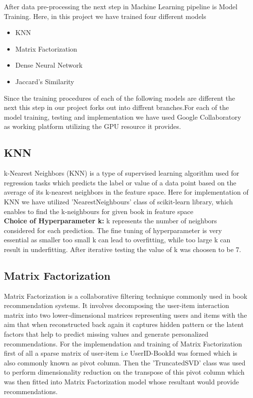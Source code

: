 After data pre-processing the next step in Machine Learning pipeline is Model Training. Here, in this project we have trained four different models 
\begin{itemize}
    \item KNN
    \item Matrix Factorization
    \item Dense Neural Network
    \item Jaccard's Similarity
\end{itemize}

Since the training procedures of each of the following models are different the next this step in our project forks out into diffrent branches.For each of the model training, testing and implementation we have used Google Collaboratory as working platform utilizing the GPU resource it provides.

\subsection*{KNN}
k-Nearest Neighbors (KNN) is a type of supervised learning algorithm used for regression tasks which predicts the label or value of a data point based on the average of its k-nearest neighbors in the feature space.
Here for implementation of KNN we have utilized 'NearestNeighbours' class of scikit-learn library, which enables to find the k-neighbours for given book in feature space \\
\textbf{Choice of Hyperparameter k:} k represents the number of neighbors considered for each prediction. The fine tuning of hyperparameter is very essential as smaller too small k can lead to overfitting, while too large k can result in underfitting.
After iterative testing the value of k was choosen to be 7.

\subsection*{Matrix Factorization}
Matrix Factorization is a collaborative filtering technique commonly used in book recommendation systems. It involves decomposing the user-item interaction matrix into two lower-dimensional matrices representing users and items with the aim that when reconstructed back again it captures hidden pattern or the latent factors that help to predict missing values and generate personalized recommendations.
For the implemendation and training of Matrix Factorization first of all a sparse matrix of user-item i.e UserID-BookId was formed which is also commonly known as pivot column. Then the 'TruncatedSVD' class was used to perform dimensionality reduction on the transpose of this pivot column which was then fitted into Matrix Factorization model whose resultant would provide recommendations.

